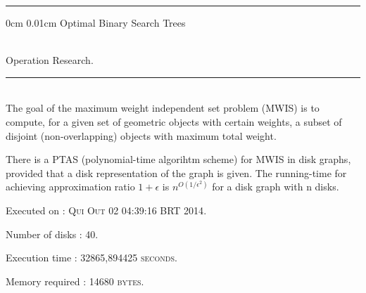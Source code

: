 \documentclass{article}
\makeatletter
\newcommand{\HRule}{\noindent\rule{\linewidth}{0.5mm}}
\renewcommand\section{\@startsection
  {section}{1}{0mm}%
  {0cm}%
  {0.01cm}%
  {\Huge\bfseries\color{black}}}%
\makeatother
\begin{document}
\HRule

\section{Optimal Binary Search Trees}

 \\[0.4cm]
{\LARGE Operation Research.}\\[0.4cm]
\HRule \\[0.5cm]
\indent The goal of the maximum weight independent set problem (MWIS) is to compute, for a given set of geometric objects with certain weights, a subset of disjoint (non-overlapping) objects with maximum total weight.

There is a PTAS (polynomial-time algorihtm scheme) for MWIS in disk graphs, provided that a disk representation of the graph is given. 
The running-time for achieving approximation ratio $1+\epsilon$ 
is $n^{O(1/\epsilon^{2})}$ for a disk graph with n disks.\\[0.5cm]
\begin{compactitem}
\item Executed on : \textsc{Qui Out 02 04:39:16 BRT 2014}. 
\item Number of disks : \textsc{40}. 
\item Execution time : \textsc{32865,894425 seconds}. 
\item Memory required : \textsc{14680 bytes}. 
\end{compactitem}
\end{document}
